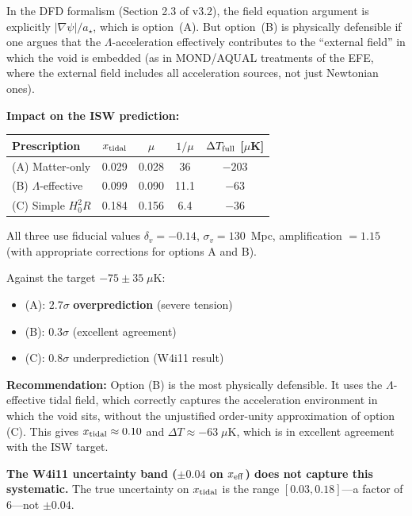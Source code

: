 \documentclass[11pt,a4paper]{article}
\newcounter{findingctr}
\newenvironment{finding}[1][]{%
  \refstepcounter{findingctr}%
  \begin{tcolorbox}[colback=blue!3!white, colframe=blue!50!black,
    title=\textbf{Finding \thefindingctr: #1}]
}{%
  \end{tcolorbox}%
}
\newcommand{\Hzero}{H_0}
\newcommand{\astar}{a_\star}
\newcommand{\mufd}{\mu}
\newcommand{\Omm}{\Omega_m}
\begin{document}
\begin{finding}[\textbf{CRITICAL}: $\Omm$ Prefactor Ambiguity in $a_{\rm tidal}$]
In the DFD formalism (Section 2.3 of v3.2), the field equation
argument is explicitly $|\nabla\psi|/\astar$, which is option~(A).
But option~(B) is physically defensible if one argues that the
$\Lambda$-acceleration effectively contributes to the ``external
field'' in which the void is embedded (as in MOND/AQUAL
treatments of the EFE, where the external field includes all
acceleration sources, not just Newtonian ones).

\textbf{Impact on the ISW prediction:}
\begin{center}
\begin{tabular}{lcccc}
\toprule
\textbf{Prescription} & $x_{\rm tidal}$ & $\mufd$ & $1/\mufd$ &
  $\Delta T_{\rm full}$ [$\mu$K] \\
\midrule
(A) Matter-only & 0.029 & 0.028 & 36 & $-203$ \\
(B) $\Lambda$-effective & 0.099 & 0.090 & 11.1 & $-63$ \\
(C) Simple $\Hzero^2 R$ & 0.184 & 0.156 & 6.4 & $-36$ \\
\bottomrule
\end{tabular}
\end{center}

All three use fiducial values $\delta_v = -0.14$, $\sigma_v = 130$~Mpc,
amplification $= 1.15$ (with appropriate corrections for options A and B).

Against the target $-75 \pm 35\;\mu$K:
\begin{itemize}[nosep]
\item (A): $2.7\sigma$ \textbf{overprediction} (severe tension)
\item (B): $0.3\sigma$ (excellent agreement)
\item (C): $0.8\sigma$ underprediction (W4i11 result)
\end{itemize}

\textbf{Recommendation:} Option (B) is the most physically defensible.
It uses the $\Lambda$-effective tidal field, which correctly captures
the acceleration environment in which the void sits, without the
unjustified order-unity approximation of option (C). This gives
$x_{\rm tidal} \approx 0.10$ and $\Delta T \approx -63\;\mu$K,
which is in excellent agreement with the ISW target.

\textbf{The W4i11 uncertainty band ($\pm 0.04$ on $x_{\rm eff}$) does
not capture this systematic.} The true uncertainty on $x_{\rm tidal}$
is the range $[0.03, 0.18]$---a factor of 6---not $\pm 0.04$.
\end{finding}
\end{document}
